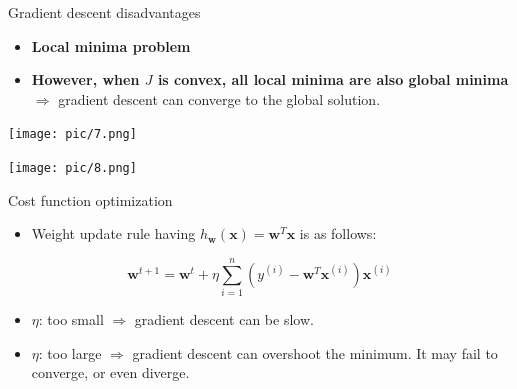 \documentclass[serif, aspectratio=169]{beamer}
\begin{document}
\begin{frame}{Gradient descent disadvantages}

    \begin{itemize}
        \item \textbf{Local minima problem}
        
        \item \textbf{However, when \( J \) is convex, all local minima are also global minima} \(\Rightarrow\) gradient descent can converge to the global solution.
    \end{itemize}

    \begin{minipage}{0.48\textwidth}
        \centering
        \texttt{[image: pic/7.png]}
    \end{minipage}%
    \begin{minipage}{0.48\textwidth}
        \centering
        \texttt{[image: pic/8.png]}
    \end{minipage}
    \vfill

\end{frame}

\begin{frame}{Cost function optimization}
    \begin{itemize}
        \item Weight update rule having $h_{\mathbf{w}}(\mathbf{x}) = \mathbf{w}^T \mathbf{x}$ is as follows:
    \end{itemize}
    
    \[
    \mathbf{w}^{t+1} = \mathbf{w}^t + \eta \sum_{i=1}^{n} \left( y^{(i)} - \mathbf{w}^T \mathbf{x}^{(i)} \right) \mathbf{x}^{(i)}
    \]

    \begin{itemize}
        \item $\eta$: too small $\Rightarrow$ gradient descent can be slow.
        \item $\eta$: too large $\Rightarrow$ gradient descent can overshoot the minimum. It may fail to converge, or even diverge.
    \end{itemize}
\end{frame}
\end{document}
